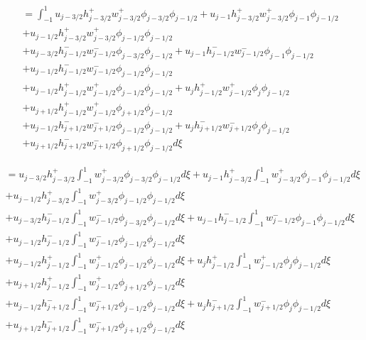 \documentclass[12pt]{article}
\begin{document}
\begin{multline*}
= \int_{-1}^{1}  u_{j - 3/2} h^+_{j - 3/2}w^+_{j - 3/2} \phi_{j - 3/2} \phi_{j-1/2} + u_{j - 1} h^+_{j - 3/2}w^+_{j - 3/2}\phi_{j - 1} \phi_{j-1/2}\\ + u_{j - 1/2} h^+_{j - 3/2}w^+_{j - 3/2}\phi_{j - 1/2}\phi_{j-1/2}
\\ +u_{j - 3/2}h^-_{j - 1/2}w^-_{j - 1/2}\phi_{j - 3/2}\phi_{j-1/2} + u_{j - 1}h^-_{j - 1/2}w^-_{j - 1/2}\phi_{j - 1}\phi_{j-1/2} \\ + u_{j - 1/2}h^-_{j - 1/2}w^-_{j - 1/2}\phi_{j - 1/2}\phi_{j-1/2} 
\\ +u_{j - 1/2}h^+_{j - 1/2}w^+_{j - 1/2}\phi_{j - 1/2}\phi_{j-1/2} + u_{j}h^+_{j - 1/2}w^+_{j - 1/2}\phi_{j }\phi_{j-1/2} \\+ u_{j + 1/2}h^+_{j - 1/2}w^+_{j - 1/2}\phi_{j + 1/2}\phi_{j-1/2} 
\\ +u_{j - 1/2}h^-_{j + 1/2}w^-_{j + 1/2} \phi_{j - 1/2}\phi_{j-1/2} + u_{j}h^-_{j + 1/2}w^-_{j + 1/2} \phi_{j }\phi_{j-1/2}\\ + u_{j + 1/2}h^-_{j + 1/2}w^-_{j + 1/2} \phi_{j + 1/2} \phi_{j-1/2}
 d\xi
\end{multline*}

\begin{multline*}
=  u_{j - 3/2} h^+_{j - 3/2} \int_{-1}^{1} w^+_{j - 3/2} \phi_{j - 3/2} \phi_{j-1/2}d\xi + u_{j - 1} h^+_{j - 3/2} \int_{-1}^{1}w^+_{j - 3/2}\phi_{j - 1} \phi_{j-1/2}d\xi\\ + u_{j - 1/2} h^+_{j - 3/2} \int_{-1}^{1} w^+_{j - 3/2}\phi_{j - 1/2}\phi_{j-1/2}d\xi
\\ +u_{j - 3/2}h^-_{j - 1/2}\int_{-1}^{1}w^-_{j - 1/2}\phi_{j - 3/2}\phi_{j-1/2}d\xi + u_{j - 1}h^-_{j - 1/2}\int_{-1}^{1}w^-_{j - 1/2}\phi_{j - 1}\phi_{j-1/2}d\xi \\ + u_{j - 1/2}h^-_{j - 1/2}\int_{-1}^{1}w^-_{j - 1/2}\phi_{j - 1/2}\phi_{j-1/2}d\xi 
\\ +u_{j - 1/2}h^+_{j - 1/2}\int_{-1}^{1}w^+_{j - 1/2}\phi_{j - 1/2}\phi_{j-1/2}d\xi + u_{j}h^+_{j - 1/2}\int_{-1}^{1}w^+_{j - 1/2}\phi_{j }\phi_{j-1/2}d\xi \\+ u_{j + 1/2}h^+_{j - 1/2}\int_{-1}^{1}w^+_{j - 1/2}\phi_{j + 1/2}\phi_{j-1/2}d\xi 
\\ +u_{j - 1/2}h^-_{j + 1/2}\int_{-1}^{1}w^-_{j + 1/2} \phi_{j - 1/2}\phi_{j-1/2}d\xi + u_{j}h^-_{j + 1/2}\int_{-1}^{1}w^-_{j + 1/2} \phi_{j }\phi_{j-1/2}d\xi\\ + u_{j + 1/2}h^-_{j + 1/2}\int_{-1}^{1}w^-_{j + 1/2} \phi_{j + 1/2} \phi_{j-1/2}
d\xi
\end{multline*}
\end{document}
